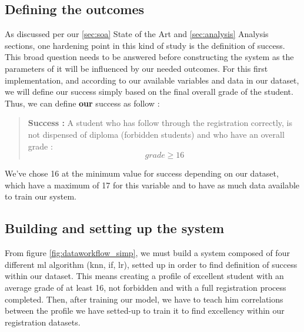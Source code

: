 \documentclass[../main.tex]{subfiles}
\begin{document}
\subsection{Defining the outcomes}

As discussed per our \ref{sec:soa} State of the Art and \ref{sec:analysis} Analysis sections, one hardening point in this kind of study is the definition of success. This broad question needs to be answered before constructing the system as the parameters of it will be influenced by our needed outcomes.
For this first implementation, and according to our available variables and data in our dataset, we will define our success simply based on the final overall grade of the student. Thus, we can define \textbf{our} success as follow :
\begin{quote}
    \textbf{Success :} A student who has follow through the registration correctly, is not dispensed of diploma (forbidden students) and who have an overall grade :
    \begin{equation}
        grade \geq 16
    \end{equation}
\end{quote}

We've chose 16 at the minimum value for success depending on our dataset, which have a maximum of 17 for this variable and to have as much data available to train our system.

\subsection{Building and setting up the system}

From figure \ref{fig:dataworkflow_simp}, we must build a system composed of four different \acrshort{ml} algorithm (\acrfull{knn}, \acrfull{if}, \acrfull{lr}), setted up in order to find definition of success within our dataset. This means creating a profile of excellent student with an average grade of at least 16, not forbidden and with a full registration process completed. 
Then, after training our model, we have to teach him correlations between the profile we have setted-up to train it to find excellency within our registration datasets.
\end{document}

